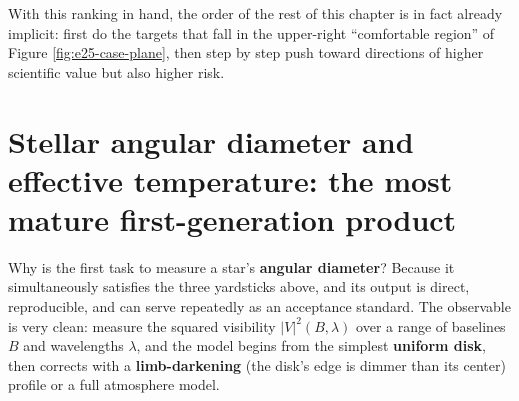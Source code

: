 With this ranking in hand, the order of the rest of this chapter is in fact already implicit: first do the targets that fall in the upper-right ``comfortable region'' of Figure \ref{fig:e25-case-plane}, then step by step push toward directions of higher scientific value but also higher risk.

\section{Stellar angular diameter and effective temperature: the most mature first-generation product}
\label{sec:e25-diameter}

Why is the first task to measure a star's \textbf{angular diameter}? Because it simultaneously satisfies the three yardsticks above, and its output is direct, reproducible, and can serve repeatedly as an acceptance standard. The observable is very clean: measure the squared visibility \(|V|^2(B,\lambda)\) over a range of baselines \(B\) and wavelengths \(\lambda\), and the model begins from the simplest \textbf{uniform disk}, then corrects with a \textbf{limb-darkening} (the disk's edge is dimmer than its center) profile or a full atmosphere model.

